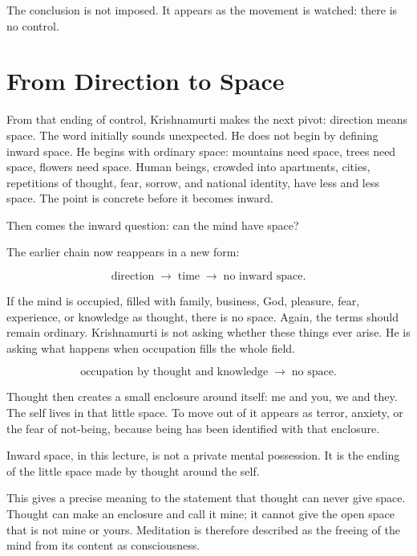 The conclusion is not imposed. It appears as the movement is watched: there is no control.

\section{From Direction to Space}

From that ending of control, Krishnamurti makes the next pivot: direction means space. The word initially sounds unexpected. He does not begin by defining inward space. He begins with ordinary space: mountains need space, trees need space, flowers need space. Human beings, crowded into apartments, cities, repetitions of thought, fear, sorrow, and national identity, have less and less space. The point is concrete before it becomes inward.

Then comes the inward question: can the mind have space?

The earlier chain now reappears in a new form:

\begin{equation}
\text{direction}
\;\longrightarrow\;
\text{time}
\;\longrightarrow\;
\text{no inward space}.
\end{equation}

If the mind is occupied, filled with family, business, God, pleasure, fear, experience, or knowledge as thought, there is no space. Again, the terms should remain ordinary. Krishnamurti is not asking whether these things ever arise. He is asking what happens when occupation fills the whole field.

\begin{equation}
\text{occupation by thought and knowledge}
\;\longrightarrow\;
\text{no space}.
\end{equation}

Thought then creates a small enclosure around itself: me and you, we and they. The self lives in that little space. To move out of it appears as terror, anxiety, or the fear of not-being, because being has been identified with that enclosure.

\begin{definition}
Inward space, in this lecture, is not a private mental possession. It is the ending of the little space made by thought around the self.
\end{definition}

This gives a precise meaning to the statement that thought can never give space. Thought can make an enclosure and call it mine; it cannot give the open space that is not mine or yours. Meditation is therefore described as the freeing of the mind from its content as consciousness.

